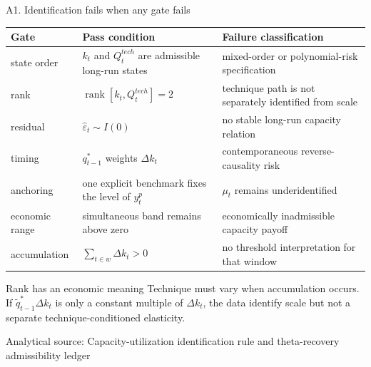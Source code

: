 \documentclass[10pt,aspectratio=169]{beamer}
\newcommand{\sourcefooter}[1]{%
  \par\vfill{\tiny\color{gray!70}Analytical source: #1}\vspace{-0.35em}}
\begin{document}
\begin{frame}{A1. Identification fails when any gate fails}
  \scriptsize
  \renewcommand{\arraystretch}{1.35}
  \begin{tabular}{@{}L{0.18\textwidth}L{0.39\textwidth}L{0.35\textwidth}@{}}
    \toprule
    \textbf{Gate} & \textbf{Pass condition} & \textbf{Failure classification} \\
    \midrule
    state order & $k_t$ and $Q_t^{tech}$ are admissible long-run states & mixed-order or polynomial-risk specification \\
    rank & $\operatorname{rank}[k_t,Q_t^{tech}]=2$ & technique path is not separately identified from scale \\
    residual & $\widehat\varepsilon_t\sim I(0)$ & no stable long-run capacity relation \\
    timing & $q_{t-1}^*$ weights $\Delta k_t$ & contemporaneous reverse-causality risk \\
    anchoring & one explicit benchmark fixes the level of $y_t^p$ & $\mu_t$ remains underidentified \\
    economic range & simultaneous band remains above zero & economically inadmissible capacity payoff \\
    accumulation & $\sum_{t\in w}\Delta k_t>0$ & no threshold interpretation for that window \\
    \bottomrule
  \end{tabular}
  \vspace{0.7em}
  \begin{block}{Rank has an economic meaning}
    Technique must vary when accumulation occurs. If $\widetilde q_{t-1}^*\Delta k_t$ is only a constant multiple of $\Delta k_t$, the data identify scale but not a separate technique-conditioned elasticity.
  \end{block}
  \sourcefooter{Capacity-utilization identification rule and theta-recovery admissibility ledger}
\end{frame}
\end{document}
